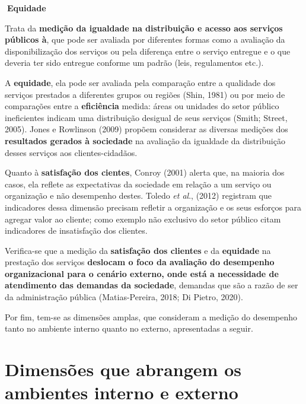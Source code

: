 \documentclass[
  letterpaper,
  DIV=11,
  numbers=noendperiod]{scrreprt}
\begin{document}
\begin{tcolorbox}[enhanced jigsaw, opacityback=0, toprule=.15mm, breakable, leftrule=.75mm, rightrule=.15mm, left=2mm, colback=white, arc=.35mm, bottomrule=.15mm]

\textbf{🔽{Equidade}}\vspace{2mm}

Trata da \textbf{medição da igualdade na distribuição e acesso aos
serviços públicos à}, que pode ser avaliada por diferentes formas como a
avaliação da disponibilização dos serviços ou pela diferença entre o
serviço entregue e o que deveria ter sido entregue conforme um padrão
(leis, regulamentos etc.).

\end{tcolorbox}

A \textbf{equidade}, ela pode ser avaliada pela comparação entre a
qualidade dos serviços prestados a diferentes grupos ou regiões (Shin,
1981) ou por meio de comparações entre a \textbf{eficiência} medida:
áreas ou unidades do setor público ineficientes indicam uma distribuição
desigual de seus serviços (Smith; Street, 2005). Jones e Rowlinson
(2009) propõem considerar as diversas medições dos \textbf{resultados
gerados à sociedade} na avaliação da igualdade da distribuição desses
serviços aos clientes-cidadãos.

Quanto à \textbf{satisfação dos cientes}, Conroy (2001) alerta que, na
maioria dos casos, ela reflete as expectativas da sociedade em relação a
um serviço ou organização e não desempenho destes. Toledo \emph{et al}.,
(2012) registram que indicadores dessa dimensão precisam refletir a
organização e os seus esforços para agregar valor ao cliente; como
exemplo não exclusivo do setor público citam indicadores de insatisfação
dos clientes.

Verifica-se que a medição da \textbf{satisfação dos clientes} e da
\textbf{equidade} na prestação dos serviços \textbf{deslocam o foco da
avaliação do desempenho organizacional para o cenário externo, onde está
a necessidade de atendimento das demandas da sociedade}, demandas que
são a razão de ser da administração pública (Matias-Pereira, 2018; Di
Pietro, 2020).

Por fim, tem-se as dimensões amplas, que consideram a medição do
desempenho tanto no ambiente interno quanto no externo, apresentadas a
seguir.

\hypertarget{dimensuxf5es-que-abrangem-os-ambientes-interno-e-externo}{%
\section{Dimensões que abrangem os ambientes interno e
externo}\label{dimensuxf5es-que-abrangem-os-ambientes-interno-e-externo}}
\end{document}
